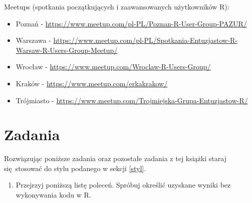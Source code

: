 \documentclass[paper=6in:9in,pagesize=pdftex,headinclude=on,footinclude=on,10pt]{scrbook}
\newenvironment{Shaded}{\begin{snugshade}}{\end{snugshade}}
\newcommand{\DecValTok}[1]{\textcolor[rgb]{0.00,0.00,0.81}{#1}}
\newcommand{\NormalTok}[1]{#1}
\newcommand{\OperatorTok}[1]{\textcolor[rgb]{0.81,0.36,0.00}{\textbf{#1}}}
\newcommand{\StringTok}[1]{\textcolor[rgb]{0.31,0.60,0.02}{#1}}
\providecommand{\tightlist}{%
  \setlength{\itemsep}{0pt}\setlength{\parskip}{0pt}}
\begin{document}
Meetups (spotkania początkujących i zaawansowanych użytkowników R):

\begin{itemize}
\tightlist
\item
  Poznań - \url{https://www.meetup.com/pl-PL/Poznan-R-User-Group-PAZUR/}
\item
  Warszawa - \url{https://www.meetup.com/pl-PL/Spotkania-Entuzjastow-R-Warsaw-R-Users-Group-Meetup/}
\item
  Wrocław - \url{https://www.meetup.com/Wroclaw-R-Users-Group/}
\item
  Kraków - \url{https://www.meetup.com/erkakrakow/}
\item
  Trójmiasto - \url{https://www.meetup.com/Trojmiejska-Grupa-Entuzjastow-R/}
\end{itemize}

\hypertarget{zadania-1}{%
\section{Zadania}\label{zadania-1}}

Rozwiązując poniższe zadania oraz pozostałe zadania z tej książki staraj się~stosować do stylu podanego w sekcji \ref{styl}.

\begin{enumerate}
\def\labelenumi{\arabic{enumi})}
\tightlist
\item
  Przejrzyj poniższą listę poleceń.
  Spróbuj określić uzyskane wyniki bez wykonywania kodu w R.
\end{enumerate}

\begin{Shaded}
\end{Shaded}
\end{document}
